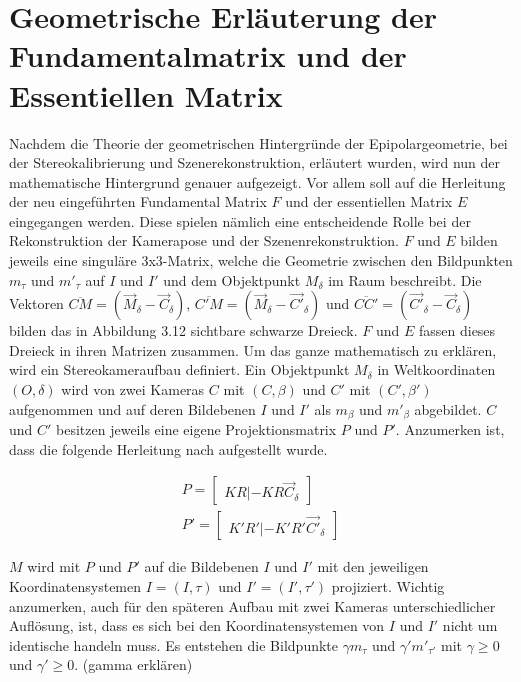 \section{Geometrische Erläuterung der Fundamentalmatrix und der Essentiellen Matrix }

Nachdem die Theorie der geometrischen Hintergründe der Epipolargeometrie, bei der Stereokalibrierung und Szenerekonstruktion, erläutert wurden, wird nun der mathematische Hintergrund genauer aufgezeigt. Vor allem soll auf die Herleitung der neu eingeführten Fundamental Matrix $F$ und der essentiellen Matrix $E$ eingegangen werden. Diese spielen nämlich eine entscheidende Rolle bei der Rekonstruktion der Kamerapose und der Szenenrekonstruktion\cite{Elements, HZ}. $F$ und $E$ bilden jeweils eine singuläre 3x3-Matrix, welche die Geometrie zwischen den Bildpunkten $m_\tau$ und $m'_\tau$ auf $I$ und $I'$ und dem Objektpunkt $M_\delta$ im Raum beschreibt. Die Vektoren $\overline{CM} = (\vec{M}_\delta - \vec{C}_\delta),\, \overline{C'M} = (\vec{M}_\delta - \vec{C'}_\delta)$ und $\overline{CC'} = (\vec{C'}_\delta - \vec{C}_\delta)$ bilden das in Abbildung 3.12 sichtbare schwarze Dreieck. $F$ und $E$ fassen dieses Dreieck in ihren Matrizen zusammen. Um das ganze mathematisch zu erklären, wird ein Stereokameraufbau definiert. Ein Objektpunkt $M_\delta$ in Weltkoordinaten$(O,\delta)$ wird von zwei Kameras $C$ mit $(C,\beta)$ und $C'$ mit $(C',\beta')$ aufgenommen und auf deren Bildebenen $I$ und $I'$ als $m_\beta$ und $m'_\beta$ abgebildet. $C$ und $C'$ besitzen jeweils eine eigene Projektionsmatrix $P$ und $P'$. Anzumerken ist, dass die folgende Herleitung nach \cite{Elements} aufgestellt wurde.

\begin{gather}
P = \begin{bmatrix}
KR|-KR\vec{C}_\delta
\end{bmatrix}\\
P' = \begin{bmatrix}
K'R'|-K'R'\vec{C'}_\delta
\end{bmatrix}
\end{gather}

$M$ wird mit $P$ und $P'$ auf die Bildebenen $I$ und $I'$ mit den jeweiligen Koordinatensystemen $I = (I,\tau)$ und $I'= (I',\tau')$ projiziert. Wichtig anzumerken, auch für den späteren Aufbau mit zwei Kameras unterschiedlicher Auflösung, ist, dass es sich bei den Koordinatensystemen von $I$ und $I'$ nicht um identische handeln muss.\cite{Elements} Es entstehen die Bildpunkte $\gamma m_\tau$ und $\gamma' m'_{\tau'}$ mit $\gamma \geq 0$ und $\gamma' \geq 0$. (gamma erklären)


